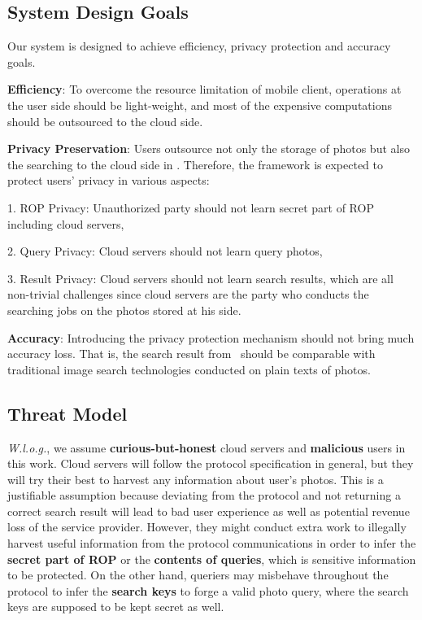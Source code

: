 \subsection{System Design Goals}
\vspace{-0.05in}




Our system is designed to achieve efficiency, privacy protection and accuracy goals.

 \textbf{Efficiency}:
To overcome the resource limitation of mobile client,
 operations at the user side should be light-weight,
 and most of the expensive computations should be outsourced to the cloud side.

 \textbf{Privacy Preservation}:
Users outsource not only the storage of photos but also the searching to the cloud side in \ourprotocolNSP.
Therefore, the framework is expected to protect users' privacy in various aspects:


 1. ROP Privacy: Unauthorized party should not learn secret part of ROP including cloud servers,

 2. Query Privacy: Cloud servers should not learn query photos,

 3. Result Privacy: Cloud servers should not learn search results,
\noindent which are all non-trivial challenges since cloud servers are the party who conducts the searching jobs on the photos stored at his side.


 \textbf{Accuracy}:
Introducing the privacy protection mechanism should not bring much accuracy loss. That is, the search result from \ourprotocolNSP~should be comparable with traditional image search technologies conducted on plain texts of photos.


\vspace{-0.05in}
\subsection{Threat Model}
\vspace{-0.05in}




\textit{W.l.o.g.}, we assume \textbf{curious-but-honest} cloud servers and \textbf{malicious} users in this work. Cloud servers will follow the protocol specification in general, but they will try their best to harvest any information about user's photos. This is a justifiable assumption because deviating from the protocol and not returning a correct search result will lead to bad user experience as well as potential revenue loss of the service provider. However, they might conduct extra work to illegally harvest useful information from the protocol communications in order to infer the \textbf{secret part of ROP} or the \textbf{contents of queries}, which is sensitive information to be protected. On the other hand, queriers may misbehave throughout the protocol to infer the \textbf{search keys} to forge a valid photo query, where the search keys are supposed to be kept secret as well.



